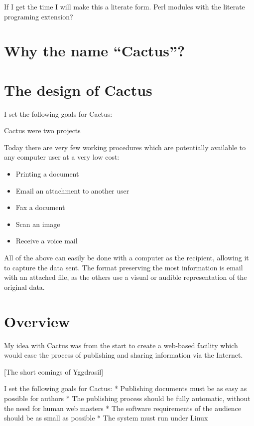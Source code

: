    If I get the time I will make this a literate form. Perl modules with
   the literate programing extension?


\section{Why the name ``Cactus''?}



\section{The design of Cactus}
\label{sec:the-design-of-cactus}

I set the following goals for Cactus:

Cactus were two projects

Today there are very few working procedures which are potentially
available to any computer user at a very low cost:

\begin{itemize}
\item Printing a document
\item Email an attachment to another user
\item Fax a document
\item Scan an image
\item Receive a voice mail
\end{itemize}

All of the above can easily be done with a computer as the recipient,
allowing it to capture the data sent.  The format preserving the most
information is email with an attached file, as the others use a visual
or audible representation of the original data.




\section{Overview}

My idea with Cactus was from the start to create a web-based facility
which would ease the process of publishing and sharing information via
the Internet.

[The short comings of Yggdrasil]

   I set the following goals for Cactus:
     * Publishing documents must be as easy as possible for authors
     * The publishing process should be fully automatic, without the need
       for human web masters
     * The software requirements of the audience should be as small as
       possible
     * The system must run under Linux

